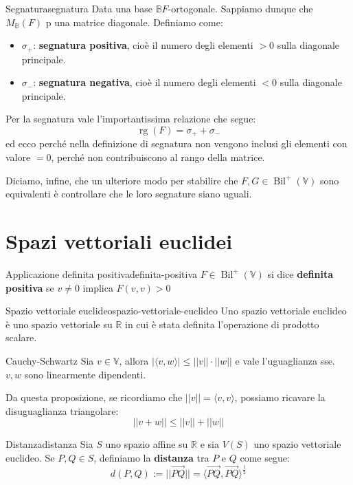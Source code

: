 \documentclass[12pt]{report}
\newcommand{\R}{\mathbb{R}}
\newcommand{\V}{\mathbb{V}}
\newcommand{\rg}{\operatorname{rg}}
\begin{document}
	\begin{definizione}{Segnatura}{segnatura}
		Data una base $\mathbb{B} F$-ortogonale. Sappiamo dunque che $M_\mathbb{B}(F)$ p una matrice diagonale.
		Definiamo come:
		\begin{itemize}
			\item $\sigma_+$: \textbf{segnatura positiva}, cioè il numero degli elementi $> 0$ sulla diagonale principale.
			\item $\sigma_-$: \textbf{segnatura negativa}, cioè il numero degli elementi $< 0$ sulla diagonale principale.
		\end{itemize}
		Per la segnatura vale l'importantissima relazione che segue:
		\[
			\rg(F) = \sigma_+ + \sigma_-
		\]
		ed ecco perché nella definizione di segnatura non vengono inclusi gli elementi con valore $= 0$, perché non contribuiscono al rango della matrice.
	\end{definizione}
	
	Diciamo, infine, che un ulteriore modo per stabilire che $F, G \in \operatorname{Bil}^+(\V)$ sono equivalenti è controllare che le loro segnature siano uguali.
	
	\newpage
	\chapter{Spazi vettoriali euclidei}
	
	\begin{definizione}{Applicazione definita positiva}{definita-positiva}
		$F \in \operatorname{Bil}^+(\V)$ si dice \textbf{definita positiva} se $v \neq 0$ implica $F(v, v) > 0$
	\end{definizione}
	
	\begin{definizione}{Spazio vettoriale euclideo}{spazio-vettoriale-euclideo}
		Uno spazio vettoriale euclideo è uno spazio vettoriale su $\R$ in cui è stata definita l'operazione di prodotto scalare.
	\end{definizione}
	
	\begin{proposizione}{Cauchy-Schwartz}{}
		Sia $v \in \V$, allora $|\langle v, w \rangle| \leq ||v|| \cdot ||w||$ e vale l'uguaglianza sse. $v, w$ sono linearmente dipendenti.
	\end{proposizione}
	Da questa proposizione, se ricordiamo che $||v|| = \langle v, v \rangle$, possiamo ricavare la disuguaglianza triangolare:
	\[
		||v+w|| \leq ||v|| + ||w||
	\]

	\begin{definizione}{Distanza}{distanza}
		Sia $S$ uno spazio affine su $\R$ e sia $V(S)$ uno spazio vettoriale euclideo. Se $P, Q \in S$, definiamo la \textbf{distanza} tra $P$ e $Q$ come segue:
		\[
			d(P, Q) := ||\overrightarrow{PQ}|| = \langle \overrightarrow{PQ}, \overrightarrow{PQ} \rangle ^{\frac{1}{2}}
		\]
	\end{definizione}
	
\end{document}
